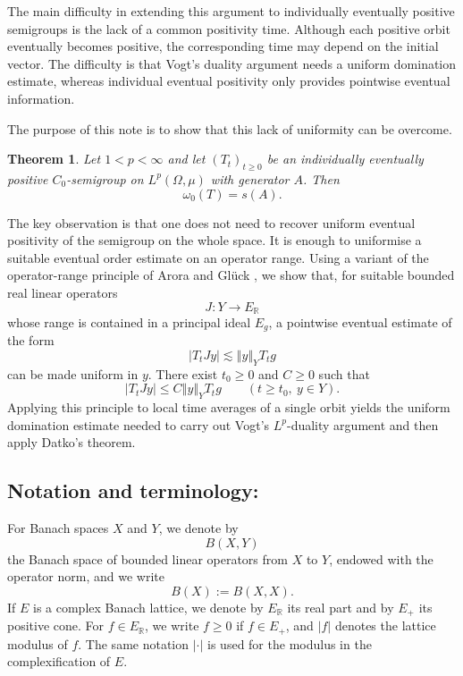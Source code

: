 \documentclass[12pt]{amsart}
\theoremstyle{plain}
\newtheorem{thm}{Theorem}[section]
\theoremstyle{definition}
\newcommand{\norm}[1]{\left\Vert #1\right\Vert}
\begin{document}
	The main difficulty in extending this argument to individually eventually
	positive semigroups is the lack of a common positivity time. Although each
	positive orbit eventually becomes positive, the corresponding time may
	depend on the initial vector. The difficulty is that Vogt's duality argument needs a uniform domination estimate, whereas individual eventual positivity only provides pointwise eventual information.
	
	The purpose of this note is to show that this lack of uniformity can be
	overcome.
	
	\begin{thm}\label{thmMain}
		Let $1<p<\infty$ and let $(T_t)_{t\ge 0}$ be an individually eventually
		positive $C_0$-semigroup on $L^p(\Omega,\mu)$ with generator $A$. Then
		\[
		\omega_0(T)=s(A).
		\]
	\end{thm}
	
	The key observation is that one does not need to recover uniform eventual
	positivity of the semigroup on the whole space. It is enough to uniformise
	a suitable eventual order estimate on an operator range. Using a variant of
	the operator-range principle of Arora and Gl\"uck
	\cite[Theorem 2.6]{AroraGlueck2024}, we show that, for suitable bounded real
	linear operators
	\[
	J\colon Y\longrightarrow E_{\mathbb R}
	\]
	whose range is contained in a principal ideal $E_g$, a pointwise eventual
	estimate of the form
	\[
	|T_tJy|\lesssim \norm{y}_Y T_tg
	\]
	can be made uniform in $y$. There exist $t_0\ge 0$ and $C\ge 0$ such that
	\begin{equation}\label{eqDom}
		|T_tJy|
		\le
		C\norm{y}_Y T_tg
		\qquad
		(t\ge t_0,\ y\in Y).
	\end{equation}
	Applying this principle to local time averages of a single orbit yields the
	uniform domination estimate needed to carry out Vogt's $L^p$-duality
	argument and then apply Datko's theorem.
	
	\subsection*{Notation and terminology:}
	For Banach spaces $X$ and $Y$, we denote by
	\[
	B(X,Y)
	\]
	the Banach space of bounded linear operators from $X$ to $Y$, endowed with
	the operator norm, and we write
	\[
	B(X):=B(X,X).
	\] If $E$ is a complex Banach lattice, we denote by $E_{\mathbb R}$
	its real part and by $E_+$ its positive cone. For $f\in E_{\mathbb R}$,
	we write $f\geq0$ if $f\in E_+$, and $|f|$ denotes the lattice modulus of
	$f$. The same notation $|\cdot|$ is used for the modulus in the
	complexification of $E$.
	
\end{document}
